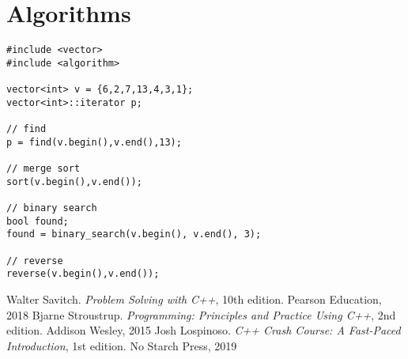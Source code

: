 \documentclass[10pt]{article}
\begin{document}
\section{Algorithms}
\small
\begin{lstlisting}
#include <vector>
#include <algorithm>

vector<int> v = {6,2,7,13,4,3,1};
vector<int>::iterator p;

// find
p = find(v.begin(),v.end(),13);

// merge sort
sort(v.begin(),v.end());

// binary search
bool found;
found = binary_search(v.begin(), v.end(), 3);

// reverse
reverse(v.begin(),v.end());
\end{lstlisting}
%
%
\small
\begin{thebibliography}{99}
 Walter Savitch. \textsl{Problem Solving with C++}, 10th edition. Pearson Education, 2018
 Bjarne Stroustrup. \textsl{Programming: Principles and Practice Using C++}, 2nd edition. Addison Wesley, 2015
 Josh Lospinoso. \textsl{C++ Crash Course: A Fast-Paced Introduction}, 1st edition. No Starch Press, 2019
\end{thebibliography}
\end{document}
